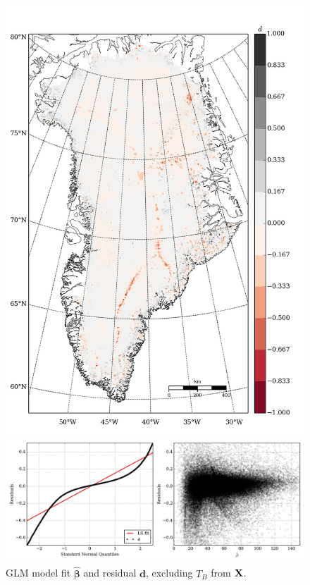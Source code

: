 \begin{figure}
\begin{minipage}[b]{0.47\linewidth}
    \includegraphics[width=1.0\textwidth]{images/greenland/stats/GLM_resid_no_T.jpg}
  \end{minipage}
  \begin{minipage}[b]{0.99\linewidth}
    \includegraphics[width=1.0\textwidth]{images/greenland/stats/GLM_resid-NQ_no_T.jpg}
  \end{minipage}
  \caption[]{GLM model fit $\bm{\hat{\beta}}$ and residual $\mathbf{d}$, excluding $T_B$ from $\mathbf{X}$.}
\end{figure}

